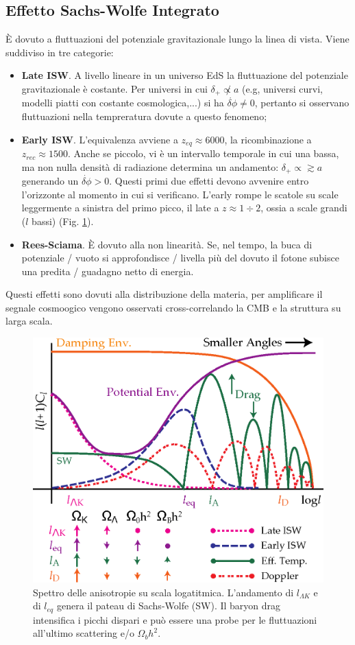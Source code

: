 \subsection{Effetto Sachs-Wolfe Integrato}
È dovuto a fluttuazioni del potenziale gravitazionale lungo la linea di vista. Viene suddiviso in tre categorie:
\begin{itemize}
    \item \textbf{Late ISW}. A livello lineare in un universo EdS la fluttuazione del potenziale gravitazionale è costante. Per universi in cui $\delta_+ \not\propto a$ (e.g, universi curvi, modelli piatti con costante cosmologica,...) si ha $\dot{\delta\phi}\neq 0$, pertanto si osservano fluttuazioni nella tempreratura dovute a questo fenomeno;
    \item \textbf{Early ISW}. L'equivalenza avviene a $z_{eq}\approx 6000$, la ricombinazione a $z_{rec}\approx 1500$. Anche se piccolo, vi è un intervallo temporale in cui una bassa, ma non nulla densità di radiazione determina un andamento: $\delta_+ \propto \gtrsim a$ generando un $\dot{\delta\phi}> 0$. Questi primi due effetti devono avvenire entro l'orizzonte al momento in cui si verificano. L'early rompe le scatole su scale leggermente a sinistra del primo picco, il late a $z\approx 1\div 2$, ossia a scale grandi ($l$ bassi) (Fig. \ref{fig11:secanisot}).
    \item \textbf{Rees-Sciama}. È dovuto alla non linearità. Se, nel tempo, la buca di potenziale / vuoto si approfondisce / livella più del dovuto il fotone subisce una predita / guadagno netto di energia. 
\end{itemize}
Questi effetti sono dovuti alla distribuzione della materia, per amplificare il segnale cosmoogico vengono osservati cross-correlando la CMB e la struttura su larga scala. 

\begin{figure}[H]
    \centering
    \includegraphics[width=0.75 \textwidth]{Pictures/11/secanisotropies.eps}
    \caption{Spettro delle anisotropie su scala logatitmica. L'andamento di $l_{\Lambda K}$ e di $l_{eq}$ genera il pateau di Sachs-Wolfe (SW). Il baryon drag intensifica i picchi dispari e può essere una probe per le fluttuazioni all'ultimo scattering e/o $\Omega_b h^2$.} \label{fig11:secanisot}
\end{figure}

